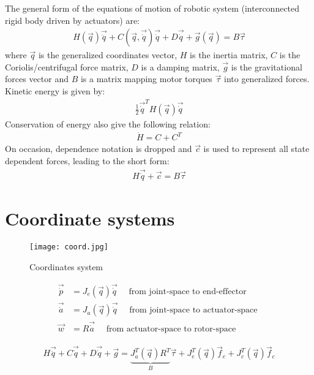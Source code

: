 The general form of the equations of motion of robotic system (interconnected rigid body driven by actuators) are:
%
\begin{align}
H(\vec{q}) \vec{\ddot{q}} + C(\vec{q},\vec{\dot{q}}) \vec{\dot{q}} + D \vec{\dot{q}} + \vec{g}(\vec{q}) = B \vec{\tau} 
\label{eq:manipulator}
\end{align}
%
where $\vec{q}$ is the generalized coordinates vector, $H$ is the inertia matrix, $C$ is the Coriolis/centrifugal force matrix, $D$ is a damping matrix, $\vec{g}$ is the gravitational forces vector and $B$ is a matrix mapping motor torques $\vec{\tau}$ into generalized forces.
%
Kinetic energy is given by:
%
\begin{align}
\frac{1}{2} \vec{\dot{q}}^T H(\vec{q}) \vec{\dot{q}} 
\label{eq:kinetic}
\end{align}
%
Conservation of energy also give the following relation:
%
\begin{align}
\dot{H} = C + C^T
\label{eq:cener}
\end{align}
%
On occasion, dependence notation is dropped and $\vec{c}$ is used to represent all state dependent forces, leading to the short form:
%
\begin{align}
H \vec{\ddot{q}} + \vec{c} = B \vec{\tau} 
\label{eq:manipulator_short}
\end{align}

\section{Coordinate systems}
\label{sec:coord}


\begin{figure}[H]
	\centering
		\texttt{[image: coord.jpg]}
	\caption{Coordinates system}
	\label{fig:coord}
\end{figure}

\begin{align}
\vec{\dot{p}}   &= J_e( \vec{q} ) \vec{\dot{q} }  \quad \text{ from joint-space to end-effector   } \\
\vec{\dot{a}}   &= J_a( \vec{q} ) \vec{\dot{q} }  \quad \text{ from joint-space to actuator-space } \\
\vec{w }        &= R              \vec{\dot{a} }  \quad \text{ from actuator-space to rotor-space } 
\label{eq:coord_transform}
\end{align}


\begin{align}
H \vec{\ddot{q}} + C \vec{\dot{q}} + D \vec{\dot{q}} + \vec{g} =  \underbrace{ J_a^T(\vec{q}) R^T }_B  \vec{\tau} + J_e^T(\vec{q}) \vec{f}_e + J_c^T(\vec{q}) \vec{f}_c
\label{eq:manipulator}
\end{align}

